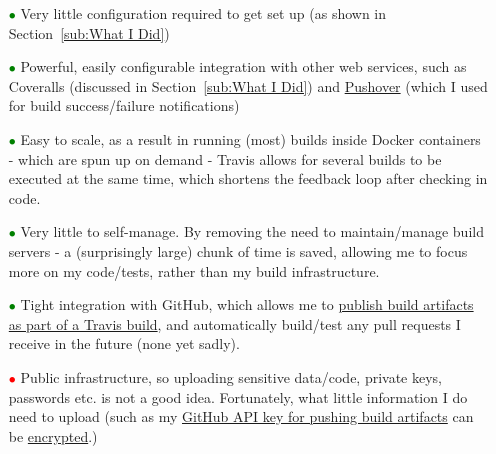 \begin{itemize}
  \item[\textcolor{green}{$\bullet$}] Very little configuration required to get
  set up (as shown in Section~\ref{sub:What I Did})
  \item[\textcolor{green}{$\bullet$}] Powerful, easily configurable integration
  with other web services, such as Coveralls
  (discussed in Section~\ref{sub:What I Did}) and \href{https://pushover.net/}{Pushover}
  (which I used for build success/failure notifications)
  \item[\textcolor{green}{$\bullet$}] Easy to scale, as a result in running (most)
  builds inside Docker containers - which are spun up on demand - Travis allows
  for several builds to be executed at the same time, which shortens the feedback
  loop after checking in code.
  \item[\textcolor{green}{$\bullet$}] Very little to self-manage. By removing the
  need to maintain/manage build servers - a (surprisingly large) chunk of time is
  saved, allowing me to focus more on my code/tests, rather than my build infrastructure.
  \item[\textcolor{green}{$\bullet$}] Tight integration with GitHub, which allows
  me to
  \href{https://github.com/FireEater64/gamq/releases}{publish build artifacts as part of a Travis build},
  and automatically build/test any pull requests I receive in the future (none yet sadly).
  \item[\textcolor{red}{$\bullet$}] Public infrastructure, so uploading sensitive
  data/code, private keys, passwords etc. is not a good idea. Fortunately, what little
  information I do need to upload (such as my \href{https://github.com/FireEater64/gamq/blob/aabc34061b46f5b743d62681e8d19a74c907ec83/.travis.yml#L27}{GitHub API key for pushing build artifacts}
  can be \href{https://docs.travis-ci.com/user/encryption-keys/}{encrypted}.)
\end{itemize}
